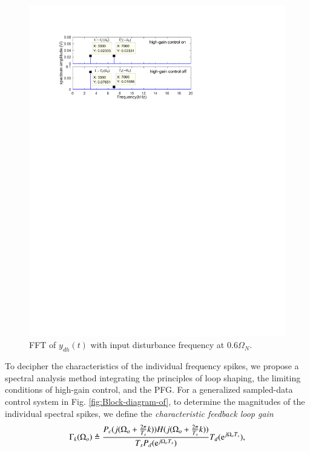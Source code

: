 \documentclass [11pt, proquest] {uwthesis}[2020/02/24]
\begin{document}
\begin{figure}[!ht]
\begin{centering}
\includegraphics[width=13cm]{Spectral-analysis/FIG4.pdf}
\par\end{centering}
\caption{\label{fig:FFT-(sampling-time-2}FFT of $y_{dh}(t)$
with input disturbance frequency at $0.6\Omega_{N}$.}
\end{figure}

To decipher the characteristics of the individual frequency spikes,
we propose a spectral analysis method integrating the principles of
loop shaping, the limiting conditions of high-gain control, and the
PFG. For a generalized sampled-data control system in Fig. \ref{fig:Block-diagram-of},
to determine the magnitudes of the individual spectral spikes, we
define the \emph{characteristic feedback loop gain}
\begin{equation}
\Gamma_{k}(\Omega_{o})\triangleq\frac{P_{c}(j(\Omega_{o}+\frac{2\pi}{T_{s}}k))H(j(\Omega_{o}+\frac{2\pi}{T_{s}}k))}{T_{s}P_{d}(\mathrm{e}^{j\Omega_{o}T_{s}})}T_{d}(\mathrm{e}^{j\Omega_{o}T_{s}}),\label{eq:Gammak_analysisFrom}
\end{equation}
\end{document}
